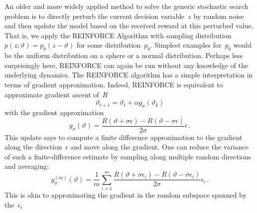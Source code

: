 \documentclass{tufte-book}
\begin{document}
An older and more widely applied method to solve the generic stochastic
search problem is to directly perturb the current decision
variable~\(z\) by random noise and then update the model based on the
received reward at this perturbed value. That is, we apply the REINFORCE
Algorithm with sampling
distribution~\(p(z;\vartheta) = p_0(z-\vartheta)\) for some
distribution~\(p_0\). Simplest examples for~\(p_0\) would be the uniform
distribution on a sphere or a normal distribution. Perhaps less
surprisingly here, REINFORCE can again be run without any knowledge of
the underlying dynamics. The REINFORCE algorithm has a simple
interpretation in terms of gradient approximation. Indeed, REINFORCE is
equivalent to approximate gradient ascent of~\(R\) \[
    \vartheta_{t+1} = \vartheta_{t} + \alpha g_\sigma(\vartheta_k)
\] with the gradient approximation \[
    g_\sigma(\vartheta) = \frac{R(\vartheta + \sigma \epsilon) - R(\vartheta - \sigma \epsilon) }{2\sigma} \epsilon\,.
\] This update says to compute a finite difference approximation to the
gradient along the direction~\(\epsilon\) and move along the gradient.
One can reduce the variance of such a finite-difference estimate by
sampling along multiple random directions and averaging: \[
    g^{(m)}_\sigma(\vartheta) = \frac{1}{m} \sum_{i=1}^m\frac{R(\vartheta + \sigma \epsilon_i) - R(\vartheta - \sigma \epsilon_i) }{2\sigma} \epsilon_i\,.
\] This is akin to approximating the gradient in the random subspace
spanned by the~\(\epsilon_i\)
\end{document}
